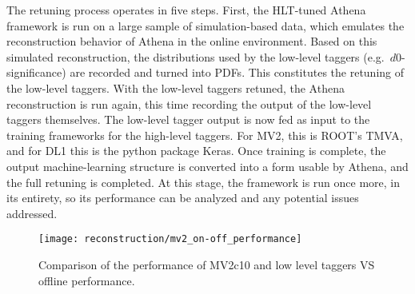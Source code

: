         The retuning process operates in five steps.
        First, the HLT-tuned Athena framework is run on a large sample of simulation-based data,
            which emulates the reconstruction behavior of Athena in the online environment.
        Based on this simulated reconstruction, the distributions used by the low-level taggers
            (e.g.\ $d0$-significance) are recorded and turned into PDFs.
        This constitutes the retuning of the low-level taggers.
        With the low-level taggers retuned, the Athena reconstruction is run again,
            this time recording the output of the low-level taggers themselves.
        The low-level tagger output is now fed as input to the training frameworks for the high-level taggers.
        For MV2, this is ROOT's TMVA, and for DL1 this is the python package Keras.
        Once training is complete, the output machine-learning structure is converted into a form usable by Athena,
            and the full retuning is completed.
        At this stage, the framework is run once more, in its entirety,
            so its performance can be analyzed and any potential issues addressed.

        \begin{figure}[tbh]
            \texttt{[image: reconstruction/mv2\_on-off\_performance]}
            \caption{
                Comparison of the performance of MV2c10 and low level taggers VS offline performance\cite{Gupta:2271945}.
            }
            \label{fig:mv2_performance}
        \end{figure}


